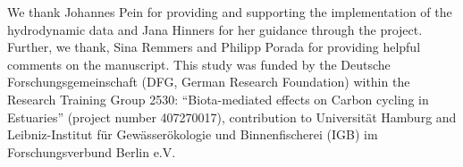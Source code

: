 \documentclass[npg, manuscript]{copernicus}
\begin{document}





\begin{acknowledgements}
We thank Johannes Pein for providing and supporting the implementation of the hydrodynamic data and Jana Hinners for her guidance through the project.
Further, we thank, Sina Remmers and Philipp Porada for providing helpful comments on the manuscript.
This study was funded by the Deutsche Forschungsgemeinschaft (DFG, German Research Foundation) within the Research Training Group 2530: “Biota-mediated effects on Carbon cycling in Estuaries” (project number 407270017), contribution to Universität Hamburg and Leibniz-Institut für Gewässerökologie und Binnenfischerei (IGB) im Forschungsverbund Berlin e.V.
\end{acknowledgements}






  





\end{document}
